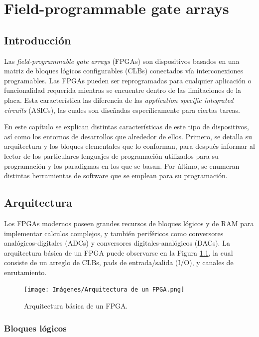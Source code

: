 \chapter{Field-programmable gate arrays}
\label{cap-fpga}

\section{Introducción}

Las \emph{field-programmable gate arrays} (FPGAs) son dispositivos basados en una matriz de bloques lógicos configurables (CLBs) conectados vía interconexiones programables.
Las FPGAs pueden ser reprogramadas para cualquier aplicación o funcionalidad requerida mientras se encuentre dentro de las limitaciones de la placa. Esta característica las diferencia de las \emph{application specific integrated circuits} (ASICs), las cuales son diseñadas específicamente para ciertas tareas.

En este capítulo se explican distintas características de este tipo de dispositivos, así como los entornos de desarrollos que alrededor de ellos. Primero, se detalla su arquitectura y los bloques elementales que lo conforman, para después informar al lector de los particulares lenguajes de programación utilizados para su programación y los paradigmas en los que se basan. Por último, se enumeran distintas herramientas de software que se emplean para su programación. 

\section{Arquitectura}

Los FPGAs modernos poseen grandes recursos de bloques lógicos y de RAM para implementar calculos complejos, y también periféricos como conversores analógicos-digitales (ADCs) y conversores digitales-analógicos (DACs). La arquitectura básica de un FPGA puede observarse en la Figura \ref{fpga}, la cual consiste de un arreglo de CLBs, pads de entrada/salida (I/O), y canales de enrutamiento.

\begin{figure}[hbt!]
    \centering
    \texttt{[image: Imágenes/Arquitectura de un FPGA.png]}
    \caption{Arquitectura básica de un FPGA.}
    \label{fpga}
\end{figure} 

\subsection{Bloques lógicos}

